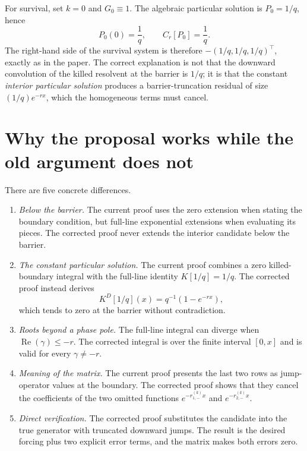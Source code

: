 \documentclass[11pt]{article}
\newcommand{\Rea}{\operatorname{Re}}
\theoremstyle{plain}
\theoremstyle{remark}
\begin{document}
For survival, set $k=0$ and $G_0\equiv1$.  The algebraic particular solution
is $P_0=1/q$, hence
\[
P_0(0)=\frac1q,
\qquad
C_r[P_0]=\frac1q.
\]
The right-hand side of the survival system is therefore
$-(1/q,1/q,1/q)^\top$, exactly as in the paper.  The correct explanation is
not that the downward convolution of the killed resolvent at the barrier is
$1/q$; it is that the constant \emph{interior particular solution} produces a
barrier-truncation residual of size $(1/q)e^{-rx}$, which the homogeneous
terms must cancel.

\section{Why the proposal works while the old argument does not}

There are five concrete differences.
\begin{enumerate}
\item \emph{Below the barrier.}  The current proof uses the zero extension
when stating the boundary condition, but full-line exponential extensions when
evaluating its pieces.  The corrected proof never extends the interior
candidate below the barrier.

\item \emph{The constant particular solution.}  The current proof combines a
zero killed-boundary integral with the full-line identity $K[1/q]=1/q$.  The
corrected proof instead derives
\[
K^D[1/q](x)=q^{-1}(1-e^{-rx}),
\]
which tends to zero at the barrier without contradiction.

\item \emph{Roots beyond a phase pole.}  The full-line integral can diverge
when $\Rea(\gamma)\leq-r$.  The corrected integral is over the finite interval
$[0,x]$ and is valid for every $\gamma\neq-r$.

\item \emph{Meaning of the matrix.}  The current proof presents the last two
rows as jump-operator values at the boundary.  The corrected proof shows that
they cancel the coefficients of the two omitted functions
$e^{-r_{1,-}^{(k)}x}$ and $e^{-r_{2,-}^{(k)}x}$.

\item \emph{Direct verification.}  The corrected proof substitutes the
candidate into the true generator with truncated downward jumps.  The result
is the desired forcing plus two explicit error terms, and the matrix makes
both errors zero.
\end{enumerate}
\end{document}
